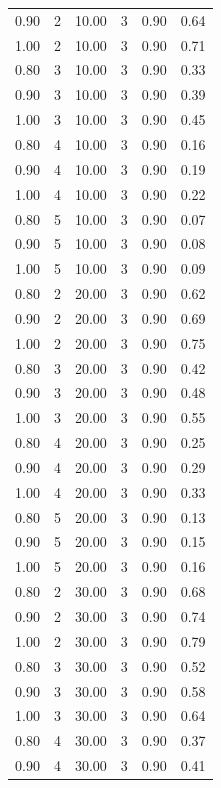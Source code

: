 \documentclass[12pt]{article}
\begin{document}
{{{{\begin{longtable}{cccccc}
  0.90 &   2 & 10.00 &   3 & 0.90 & 0.64 \\ 
  1.00 &   2 & 10.00 &   3 & 0.90 & 0.71 \\ 
  0.80 &   3 & 10.00 &   3 & 0.90 & 0.33 \\ 
  0.90 &   3 & 10.00 &   3 & 0.90 & 0.39 \\ 
  1.00 &   3 & 10.00 &   3 & 0.90 & 0.45 \\ 
  0.80 &   4 & 10.00 &   3 & 0.90 & 0.16 \\ 
  0.90 &   4 & 10.00 &   3 & 0.90 & 0.19 \\ 
  1.00 &   4 & 10.00 &   3 & 0.90 & 0.22 \\ 
  0.80 &   5 & 10.00 &   3 & 0.90 & 0.07 \\ 
  0.90 &   5 & 10.00 &   3 & 0.90 & 0.08 \\ 
  1.00 &   5 & 10.00 &   3 & 0.90 & 0.09 \\ 
  0.80 &   2 & 20.00 &   3 & 0.90 & 0.62 \\ 
  0.90 &   2 & 20.00 &   3 & 0.90 & 0.69 \\ 
  1.00 &   2 & 20.00 &   3 & 0.90 & 0.75 \\ 
  0.80 &   3 & 20.00 &   3 & 0.90 & 0.42 \\ 
  0.90 &   3 & 20.00 &   3 & 0.90 & 0.48 \\ 
  1.00 &   3 & 20.00 &   3 & 0.90 & 0.55 \\ 
  0.80 &   4 & 20.00 &   3 & 0.90 & 0.25 \\ 
  0.90 &   4 & 20.00 &   3 & 0.90 & 0.29 \\ 
  1.00 &   4 & 20.00 &   3 & 0.90 & 0.33 \\ 
  0.80 &   5 & 20.00 &   3 & 0.90 & 0.13 \\ 
  0.90 &   5 & 20.00 &   3 & 0.90 & 0.15 \\ 
  1.00 &   5 & 20.00 &   3 & 0.90 & 0.16 \\ 
  0.80 &   2 & 30.00 &   3 & 0.90 & 0.68 \\ 
  0.90 &   2 & 30.00 &   3 & 0.90 & 0.74 \\ 
  1.00 &   2 & 30.00 &   3 & 0.90 & 0.79 \\ 
  0.80 &   3 & 30.00 &   3 & 0.90 & 0.52 \\ 
  0.90 &   3 & 30.00 &   3 & 0.90 & 0.58 \\ 
  1.00 &   3 & 30.00 &   3 & 0.90 & 0.64 \\ 
  0.80 &   4 & 30.00 &   3 & 0.90 & 0.37 \\ 
  0.90 &   4 & 30.00 &   3 & 0.90 & 0.41 \\ 

\end{longtable}}}}}
\end{document}
